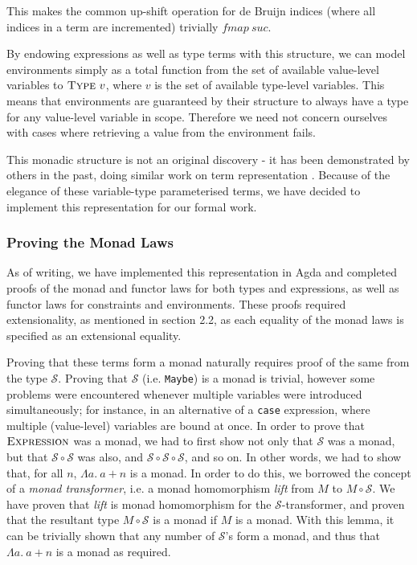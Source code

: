 \documentclass[a4paper]{jfp}
\begin{document}
This makes the common up-shift operation for de Bruijn indices (where all indices in a term are incremented) trivially $\mathit{fmap}\ \mathit{suc}$.

\medskip

By endowing expressions as well as type terms with this structure, we can model environments simply as a total function from the set of available value-level variables to $\textsc{Type}\ v$, where $v$ is the set of available type-level variables. This means that environments are guaranteed by their structure to always have a type for any value-level variable in scope. Therefore we need not concern ourselves with cases where retrieving a value from the environment fails.

\medskip

This monadic structure is not an original discovery - it has been demonstrated by others in the past, doing similar work on term representation \cite{Bird:1999:DBN:968699.968702, Bellegarde:1994:SFM:202774.202788}. Because of the elegance of these variable-type parameterised terms, we have decided to implement this representation for our formal work. 

\subsubsection*{Proving the Monad Laws}

As of writing, we have implemented this representation in Agda and completed proofs of the monad and functor laws for both types and expressions, as well as functor laws for constraints and environments. These proofs required extensionality, as mentioned in section 2.2, as each equality of the monad laws is specified as an extensional equality.

Proving that these terms form a monad naturally requires proof of the same from the type $\mathcal{S}$. Proving that $\mathcal{S}$ (i.e. {\tt Maybe}) is a monad is trivial, however some problems were encountered whenever multiple variables were introduced simultaneously; for instance, in an alternative of a {\tt case} expression, where multiple (value-level) variables are bound at once. In order to prove that $\textsc{Expression}$ was a monad, we had to first show not only that $\mathcal{S}$ was a monad, but that $\mathcal{S} \circ \mathcal{S}$ was also, and $\mathcal{S} \circ \mathcal{S} \circ \mathcal{S}$, and so on. In other words, we had to show that, for all $n$, $\Lambda a.\ a + n$ is a monad. In order to do this, we borrowed the concept of a \emph{monad transformer}, i.e. a monad homomorphism \emph{lift} from $M$ to $M \circ \mathcal{S}$. We have proven that \emph{lift} is monad homomorphism for the $\mathcal{S}$-transformer, and proven that the resultant type $M \circ \mathcal{S}$ is a monad if $M$ is a monad. With this lemma, it can be trivially shown that any number of $\mathcal{S}$'s form a monad, and thus that $\Lambda a.\ a + n$ is a monad as required.
\end{document}
